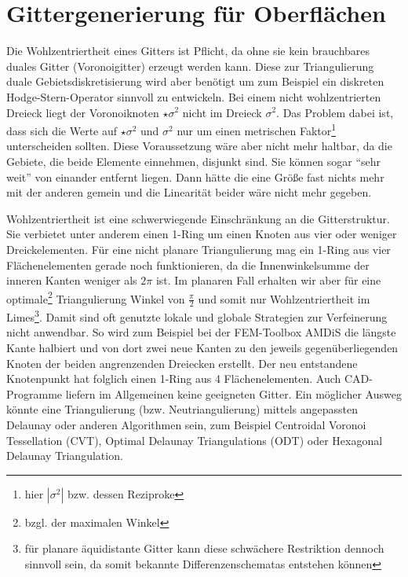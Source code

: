 \section{Gittergenerierung für Oberflächen}
\label{secGittergenerierung}


  \begin{ziel}
    Die Wohlzentriertheit eines Gitters ist Pflicht, da ohne sie kein brauchbares duales Gitter (Voronoigitter) erzeugt werden kann. 
    Diese zur Triangulierung duale Gebietsdiskretisierung wird aber benötigt um zum Beispiel ein diskreten Hodge-Stern-Operator sinnvoll zu entwickeln. 
    Bei einem nicht wohlzentrierten Dreieck liegt der Voronoiknoten \( \star\sigma^{2} \) nicht im Dreieck \( \sigma^{2} \).
    Das Problem dabei ist, dass sich die Werte auf \( \star\sigma^{2} \) und \( \sigma^{2} \) nur um einen 
    metrischen Faktor\footnote{hier \( |\sigma^{2}| \) bzw. dessen Reziproke} unterscheiden sollten.
    Diese Voraussetzung wäre aber nicht mehr haltbar, da die Gebiete, die beide Elemente einnehmen, disjunkt sind. 
    Sie können sogar  "`sehr weit"'
    von einander entfernt liegen.
    Dann hätte die eine Größe fast nichts mehr mit der anderen gemein und die Linearität beider wäre nicht mehr gegeben.

    Wohlzentriertheit ist eine schwerwiegende Einschränkung an die Gitterstruktur. Sie verbietet unter anderem einen 1-Ring um einen Knoten aus vier oder weniger Dreickelementen.
    Für eine nicht planare Triangulierung mag ein 1-Ring aus vier Flächenelementen gerade noch funktionieren, da die Innenwinkelsumme der inneren Kanten weniger als \( 2\pi \) ist.
    Im planaren Fall erhalten wir aber für eine optimale\footnote{bzgl. der maximalen Winkel} Triangulierung Winkel von \( \frac{\pi}{2} \) 
    und somit nur Wohlzentriertheit im Limes\footnote{für planare äquidistante Gitter kann diese schwächere Restriktion dennoch sinnvoll sein, da somit bekannte Differenzenschematas entstehen können}.
    Damit sind oft genutzte lokale und globale Strategien zur Verfeinerung nicht anwendbar. 
    So wird zum Beispiel bei der FEM-Toolbox AMDiS \cite{amdis} die längste Kante halbiert und von dort zwei neue Kanten zu den jeweils gegenüberliegenden Knoten der beiden angrenzenden Dreiecken erstellt. Der neu entstandene Knotenpunkt hat folglich einen 1-Ring aus 4 Flächenelementen.
    Auch CAD-Programme liefern im Allgemeinen keine geeigneten Gitter. 
    Ein möglicher Ausweg könnte eine Triangulierung (bzw. Neutriangulierung) mittels angepassten Delaunay oder anderen Algorithmen sein, zum Beispiel Centroidal Voronoi Tessellation (CVT)\cite{CVTGunzburger}, 
    Optimal Delaunay Triangulations (ODT)\cite{ODT} oder Hexagonal Delaunay Triangulation\cite{HDT}.


\end{ziel}
